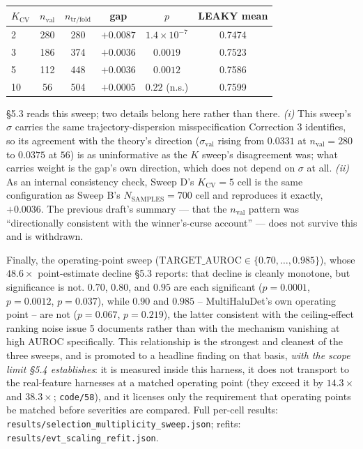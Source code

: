 \documentclass[10pt]{article} %
\begin{document}
\begin{center}\small
\begin{tabular}{lccccc}
\toprule
$K_{\text{CV}}$ & $n_{\text{val}}$ & $n_{\text{tr/fold}}$ & gap & $p$ & LEAKY mean \\
\midrule
2  & 280 & 280 & $+0.0087$ & $1.4\times10^{-7}$ & 0.7474 \\
3  & 186 & 374 & $+0.0036$ & $0.0019$ & 0.7523 \\
5  & 112 & 448 & $+0.0036$ & $0.0012$ & 0.7586 \\
10 & 56  & 504 & $+0.0005$ & $0.22$ (n.s.) & 0.7599 \\
\bottomrule
\end{tabular}
\end{center}

§5.3 reads this sweep; two details belong here rather than there. \emph{(i)}
This sweep's $\sigma$ carries the same trajectory-dispersion misspecification
Correction 3 identifies, so its agreement with the theory's direction
($\sigma_{\text{val}}$ rising from $0.0331$ at $n_{\text{val}}=280$ to
$0.0375$ at $56$) is as uninformative as the $K$ sweep's disagreement was;
what carries weight is the gap's own direction, which does not depend on
$\sigma$ at all. \emph{(ii)} As an internal consistency check, Sweep D's
$K_{\text{CV}}=5$ cell is the same configuration as Sweep B's
$N_{\text{SAMPLES}}=700$ cell and reproduces it exactly, $+0.0036$. The
previous draft's summary --- that the $n_{\text{val}}$ pattern was
``directionally consistent with the winner's-curse account'' --- does not
survive this and is withdrawn.

Finally, the operating-point sweep
($\text{TARGET\_AUROC}\in\{0.70,\ldots,0.985\}$), whose $48.6\times$
point-estimate decline §5.3 reports: that decline is cleanly monotone, but
significance is not. $0.70$, $0.80$, and $0.95$ are each significant
($p=0.0001$, $p=0.0012$, $p=0.037$), while $0.90$ and $0.985$ -- MultiHaluDet's
own operating point -- are not ($p=0.067$, $p=0.219$), the latter consistent
with the ceiling-effect ranking noise issue 5 documents rather than with the
mechanism vanishing at high AUROC specifically. This relationship is the
strongest and cleanest of the three sweeps, and is promoted to a headline
finding on that basis, \emph{with the scope limit §5.4 establishes}: it is
measured inside this harness, it does not transport to the real-feature
harnesses at a matched operating point (they exceed it by $14.3\times$ and
$38.3\times$; \texttt{code/58}), and it licenses only the requirement that
operating points be matched before severities are compared. Full per-cell
results: \texttt{results/selection\_multiplicity\_sweep.json}; refits:
\texttt{results/evt\_scaling\_refit.json}.
\end{document}

